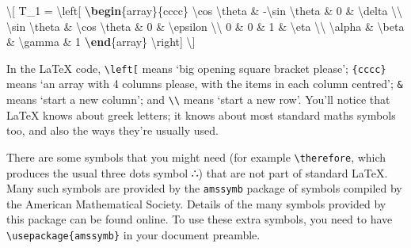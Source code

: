 \documentclass[
]{book}
\newenvironment{Shaded}{\begin{snugshade}}{\end{snugshade}}
\newcommand{\ExtensionTok}[1]{#1}
\newcommand{\KeywordTok}[1]{\textcolor[rgb]{0.13,0.29,0.53}{\textbf{#1}}}
\newcommand{\NormalTok}[1]{#1}
\newcommand{\SpecialCharTok}[1]{\textcolor[rgb]{0.00,0.00,0.00}{#1}}
\newcommand{\SpecialStringTok}[1]{\textcolor[rgb]{0.31,0.60,0.02}{#1}}
\begin{document}
\begin{Shaded}
\begin{Highlighting}[]
   \SpecialStringTok{\textbackslash{}[ T\_1 = }\SpecialCharTok{\textbackslash{}left}\SpecialStringTok{[}
\SpecialStringTok{    }\KeywordTok{\textbackslash{}begin}\NormalTok{\{}\ExtensionTok{array}\NormalTok{\}}\SpecialStringTok{\{cccc\}}
\SpecialStringTok{    }\SpecialCharTok{\textbackslash{}cos}\SpecialStringTok{ }\SpecialCharTok{\textbackslash{}theta}\SpecialStringTok{ \& {-}}\SpecialCharTok{\textbackslash{}sin}\SpecialStringTok{ }\SpecialCharTok{\textbackslash{}theta}\SpecialStringTok{ \& 0 \& }\SpecialCharTok{\textbackslash{}delta}\SpecialStringTok{ }\SpecialCharTok{\textbackslash{}\textbackslash{}}
\SpecialStringTok{    }\SpecialCharTok{\textbackslash{}sin}\SpecialStringTok{ }\SpecialCharTok{\textbackslash{}theta}\SpecialStringTok{  \& }\SpecialCharTok{\textbackslash{}cos}\SpecialStringTok{ }\SpecialCharTok{\textbackslash{}theta}\SpecialStringTok{ \& 0 \& }\SpecialCharTok{\textbackslash{}epsilon}\SpecialStringTok{ }\SpecialCharTok{\textbackslash{}\textbackslash{}}
\SpecialStringTok{    0 \& 0 \& 1 \& }\SpecialCharTok{\textbackslash{}eta}\SpecialStringTok{ }\SpecialCharTok{\textbackslash{}\textbackslash{}}
\SpecialStringTok{    }\SpecialCharTok{\textbackslash{}alpha}\SpecialStringTok{ \& }\SpecialCharTok{\textbackslash{}beta}\SpecialStringTok{ \& }\SpecialCharTok{\textbackslash{}gamma}\SpecialStringTok{ \& 1}
\SpecialStringTok{    }\KeywordTok{\textbackslash{}end}\NormalTok{\{}\ExtensionTok{array}\NormalTok{\}}
\SpecialStringTok{    }\SpecialCharTok{\textbackslash{}right}\SpecialStringTok{] \textbackslash{}]}
\end{Highlighting}
\end{Shaded}

In the LaTeX code, \texttt{\textbackslash{}left{[}} means `big opening square bracket please'; \texttt{\{cccc\}} means `an array with 4 columns please, with the items in each column centred'; \texttt{\&} means `start a new column'; and \texttt{\textbackslash{}\textbackslash{}} means `start a new row'. You'll notice that LaTeX knows about greek letters; it knows about most standard maths symbols too, and also the ways they're usually used.

There are some symbols that you might need (for example \texttt{\textbackslash{}therefore}, which produces the usual three dots symbol ∴) that are not part of standard LaTeX. Many such symbols are provided by the \texttt{amssymb} package of symbols compiled by the American Mathematical Society. Details of the many symbols provided by this package can be found online. To use these extra symbols, you need to have \texttt{\textbackslash{}usepackage\{amssymb\}} in your document preamble.
\end{document}
